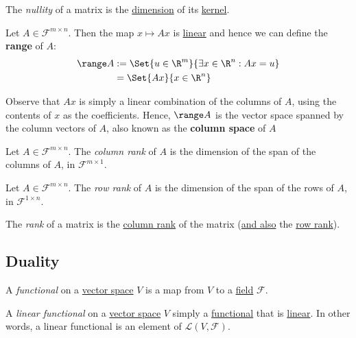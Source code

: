 \label{bd8d6b4}

The \textit{nullity} of a matrix is the \href{cd4284b}{dimension} of its
\href{d6bf553}{kernel}.

\label{c8d6fe2}

Let $A\in\mathcal F^{m\times n}$. Then the map $x\mapsto Ax$ is
\href{d7d1925}{linear} and hence we can define the \textbf{range} of $A$:
\begin{align*}
  \range A &:=\Set{u\in\R^m}{\exists x\in\R^n:Ax=u} \\
           &=\Set{Ax}{x\in\R^n}
\end{align*}

Observe that $Ax$ is simply a linear combination of the columns of $A$, using
the contents of $x$ as the coefficients. Hence, $\range A$ is the vector space
spanned by the column vectors of $A$, also known as the \textbf{column space}
of $A$

\label{bc27a95}

Let $A\in\mathcal F^{m\times n}$. The \textit{column rank} of $A$ is the
dimension of the span of the columns of $A$, in $\mathcal F^{m\times1}$.

\label{bae7bca}

Let $A\in\mathcal F^{m\times n}$. The \textit{row rank} of $A$ is the dimension
of the span of the rows of $A$, in $\mathcal F^{1\times n}$.

\label{ecd3948}

The \textit{rank} of a matrix is the \href{bc27a95}{column rank} of the matrix
(\href{a8e348c}{and also} the \href{bae7bca}{row rank}).

\subsection{Duality}\label{dbc6b7f}

\label{e824ec7}

A \textit{functional} on a \href{fc83050}{vector space} $V$ is a map from $V$
to a \href{aec6040}{field} $\mathcal F$.

\label{b0b1db8}

A \textit{linear functional} on a \href{fc83050}{vector space} $V$ simply a
\href{e824ec7}{functional} that is \href{d7d1925}{linear}. In other words, a
linear functional is an element of \href{ab1f2fb}{$\mathcal L(V,\mathcal F)$}.

